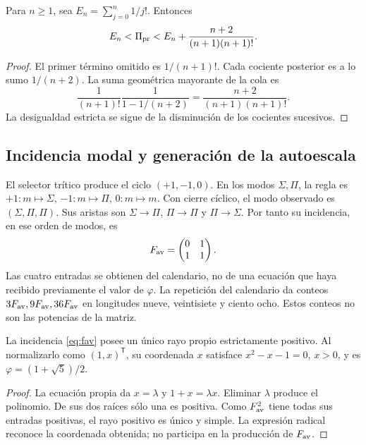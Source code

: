 \begin{proposition}
Para \(n\ge1\), sea \(E_n=\sum_{j=0}^n1/j!\). Entonces
\[
 E_n<\Pi_{\rm pr}<E_n+\frac{n+2}{(n+1)(n+1)!}.
\]
\end{proposition}
\begin{proof}
El primer término omitido es \(1/(n+1)!\). Cada cociente posterior es a lo sumo \(1/(n+2)\). La suma geométrica mayorante de la cola es
\[
 \frac1{(n+1)!}\frac1{1-1/(n+2)}
 =\frac{n+2}{(n+1)(n+1)!}.
\]
La desigualdad estricta se sigue de la disminución de los cocientes sucesivos.
\end{proof}

\subsection{Incidencia modal y generación de la autoescala}

El selector trítico produce el ciclo \((+1,-1,0)\). En los modos \(\Sigma,\Pi\), la regla es \(+1:m\mapsto\Sigma\), \(-1:m\mapsto\Pi\), \(0:m\mapsto m\). Con cierre cíclico, el modo observado es \((\Sigma,\Pi,\Pi)\). Sus aristas son \(\Sigma\to\Pi\), \(\Pi\to\Pi\) y \(\Pi\to\Sigma\). Por tanto su incidencia, en ese orden de modos, es
\begin{equation}
 F_{\rm av}=\begin{pmatrix}0&1\\1&1\end{pmatrix}.
 \label{eq:fav}
\end{equation}
Las cuatro entradas se obtienen del calendario, no de una ecuación que haya recibido previamente el valor de \(\varphi\). La repetición del calendario da conteos \(3F_{\rm av},9F_{\rm av},36F_{\rm av}\) en longitudes nueve, veintisiete y ciento ocho. Estos conteos no son las potencias de la matriz.

\begin{theorem}
La incidencia \eqref{eq:fav} posee un único rayo propio estrictamente positivo. Al normalizarlo como \((1,x)^{\mathsf T}\), su coordenada \(x\) satisface \(x^2-x-1=0\), \(x>0\), y es \(\varphi=(1+\sqrt5)/2\).
\end{theorem}
\begin{proof}
La ecuación propia da \(x=\lambda\) y \(1+x=\lambda x\). Eliminar \(\lambda\) produce el polinomio. De sus dos raíces sólo una es positiva. Como \(F_{\rm av}^2\) tiene todas sus entradas positivas, el rayo positivo es único y simple. La expresión radical reconoce la coordenada obtenida; no participa en la producción de \(F_{\rm av}\).
\end{proof}

